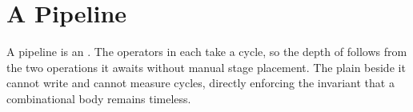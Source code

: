 \section{A Pipeline}
\label{sec:x-pipeline}

A pipeline is an . The operators in
 each take a cycle, so the depth of 
follows from the two operations it awaits without manual stage placement.
The plain  beside it cannot write  and cannot
measure cycles, directly enforcing the invariant that a combinational
body remains timeless.



